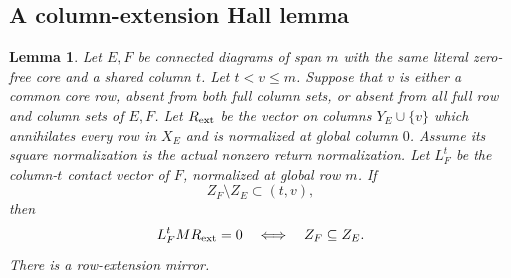 \documentclass[11pt,a4paper]{amsart}
\numberwithin{equation}{section}
\theoremstyle{plain}
\newtheorem{lemma}[theorem]{Lemma}
\theoremstyle{definition}
\begin{document}
\subsection{A column-extension Hall lemma}

\begin{lemma}\label{lem:column-extension}
Let \(E,F\) be connected diagrams of span \(m\) with the same literal
zero-free core and a shared column \(t\).  Let \(t<v\le m\).  Suppose that
\(v\) is either a common core row, absent from both full column sets, or
absent from all full row and column sets of \(E,F\).
Let \(R_{\rm ext}\) be the vector on columns \(Y_E\cup\{v\}\) which
annihilates every row in \(X_E\) and is normalized at global column \(0\).
Assume its square normalization is the actual nonzero return
normalization.  Let \(L_F^t\) be the column-\(t\) contact vector of \(F\),
normalized at global row \(m\).  If
\begin{equation}\label{eq:extension-domain}
 Z_F\setminus Z_E\subset(t,v),
\end{equation}
then
\begin{equation}\label{eq:extension-inclusion}
 L_F^tMR_{\rm ext}=0\quad\Longleftrightarrow\quad Z_F\subseteq Z_E.
\end{equation}
There is a row-extension mirror.
\end{lemma}
\end{document}
